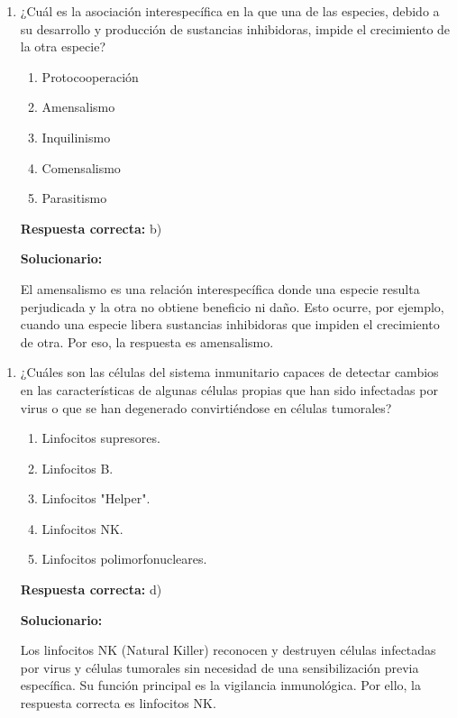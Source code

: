 \begin{enumerate}[resume]
	
	\item ¿Cuál es la asociación interespecífica en la que una de las especies, debido a su desarrollo y producción de sustancias inhibidoras, impide el crecimiento de la otra especie?
	
	\begin{enumerate}[label=\alph*)]
		\item Protocooperación
		\item Amensalismo
		\item Inquilinismo
		\item Comensalismo
		\item Parasitismo
	\end{enumerate}
	
	\textbf{Respuesta correcta:} b)
	
	\vspace{2mm}
	\textbf{Solucionario:}
	
	El amensalismo es una relación interespecífica donde una especie resulta perjudicada y la otra no obtiene beneficio ni daño. Esto ocurre, por ejemplo, cuando una especie libera sustancias inhibidoras que impiden el crecimiento de otra. Por eso, la respuesta es amensalismo.
	
\end{enumerate}


\begin{enumerate}[resume]
	
	\item ¿Cuáles son las células del sistema inmunitario capaces de detectar cambios en las características de algunas células propias que han sido infectadas por virus o que se han degenerado convirtiéndose en células tumorales?
	
	\begin{enumerate}[label=\alph*)]
		\item Linfocitos supresores.
		\item Linfocitos B.
		\item Linfocitos "Helper".
		\item Linfocitos NK.
		\item Linfocitos polimorfonucleares.
	\end{enumerate}
	
	\textbf{Respuesta correcta:} d)
	
	\vspace{2mm}
	\textbf{Solucionario:}
	
	Los linfocitos NK (Natural Killer) reconocen y destruyen células infectadas por virus y células tumorales sin necesidad de una sensibilización previa específica. Su función principal es la vigilancia inmunológica. Por ello, la respuesta correcta es linfocitos NK.
	
\end{enumerate}

